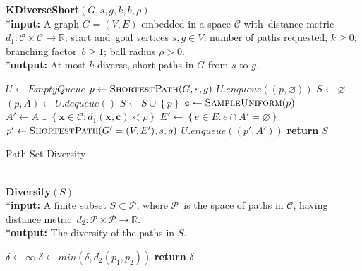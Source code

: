 \documentclass[letterpaper,12pt]{article}
\begin{document}
\hangindent=20pt\hspace*{20pt}\textbf{KDiverseShort}$(G,s,g,k,b,\rho)$
\\*\textbf{input:} A graph $G=(V,E)$ embedded in a space $\mathcal{C}$ with\
distance metric $d_1:\mathcal{C}\times \mathcal{C}\to\mathbb{R}$; start and\
goal vertices $s,g\in V$; number of paths requested, $k\ge0$; branching factor\
$b\ge1$; ball radius $\rho>0$.
\\*\textbf{output:} At most $k$ diverse, short paths in $G$ from $s$ to $g$.
\begin{algorithmic}[1]
\State $U\gets EmptyQueue$
\State $p\gets \Call{ShortestPath}{G,s,g}$
    \State $U.enqueue((p,\varnothing))$
\EndIf
\State $S\gets\varnothing$
    \State $(p,A)\gets U.dequeue()$
    \State $S\gets S\cup\left\{p\right\}$
    \For{$i\gets 1, b$}
        \State $\mathbf{c}\gets \Call{SampleUniform}{p}$
        \State $A'\gets A\cup\left\{\mathbf{x}\in \mathcal{C}:d_1(\mathbf{x},\mathbf{c})<\rho\right\}$
        \State $E'\gets\left\{{e\in E:e\cap A'=\varnothing}\right\}$
        \State $p'\gets \Call{ShortestPath}{G'=(V,E'),s,g}$
        \If{$p'\textbf{ not empty}$}
            \State $U.enqueue((p',A'))$
        \EndIf
    \EndFor
\EndWhile
\State \textbf{return }$S$
\end{algorithmic}

\begin{algorithm}
\caption{Path Set Diversity}
\small \textbf
\\\hangindent=20pt\textbf{Diversity}$(S)$
\\*\textbf{input:} A finite subset $S\subset \mathcal{P}$, where $\mathcal{P}$\
is the space of paths in $\mathcal{C}$, having distance metric\
$d_2:\mathcal{P}\times\mathcal{P}\to\mathbb{R}$.
\\*\textbf{output:} The diversity of the paths in $S$.
\begin{algorithmic}[1]
\State $\delta\gets \infty$
\ForAll{$p_1\in S$}
        \State $\delta\gets min(\delta,d_2(p_1,p_2))$
    \EndFor
\EndFor
\State \textbf{return }$\delta$
\end{algorithmic}
\end{algorithm}
\end{document}
